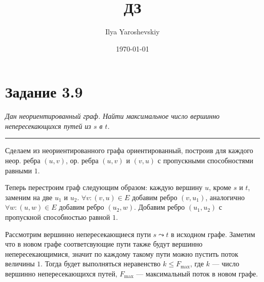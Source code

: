 \documentclass[english]{article}
\author{Ilya Yaroshevskiy}
\date{\today}
\title{ДЗ}
\theoremstyle{plain}
\theoremstyle{remark}
\theoremstyle{definition}
\begin{document}
\maketitle
\tableofcontents

\usetikzlibrary{decorations.pathmorphing}


\section*{Задание 3.9}
\label{sec:org7121ed2}
\emph{Дан неориентированный граф. Найти максимальное число вершинно непересекающихся путей
из \(s\) в \(t\)}.

\noindent\rule{\textwidth}{0.5pt}
Сделаем из неориентированного графа ориентированный, построив для
каждого неор. ребра \((u, v)\), ор. ребра \((u, v)\) и \((v, u)\) с
пропускными способностями равными \(1\).

Теперь перестроим граф следующим образом: каждую вершину \(u\), кроме \(s\) и \(t\), заменим
на две \(u_1\) и \(u_2\). \(\forall v: (v, u) \in E\) добавим ребро
\((v, u_1)\), аналогично \(\forall w: (u, w) \in E\) добавим ребро
\((u_2, w)\). Добавим ребро \((u_1, u_2)\) с пропускной способностью
равной \(1\).

\begin{center}
\end{center}

Рассмотрим вершинно непересекающиеся пути \(s \leadsto t\) в исходном графе. Заметим
что в новом графе соответсвующие пути также будут вершинно непересекающимися,
значит по каждому такому пути можно пустить поток величины
\(1\). Тогда будет выполняться неравенство \(k \le F_{\max}\), где \(k\) ---
число вершинно непересекающихся путей, \(F_{\max}\) --- максимальный поток в новом графе.
\end{document}
